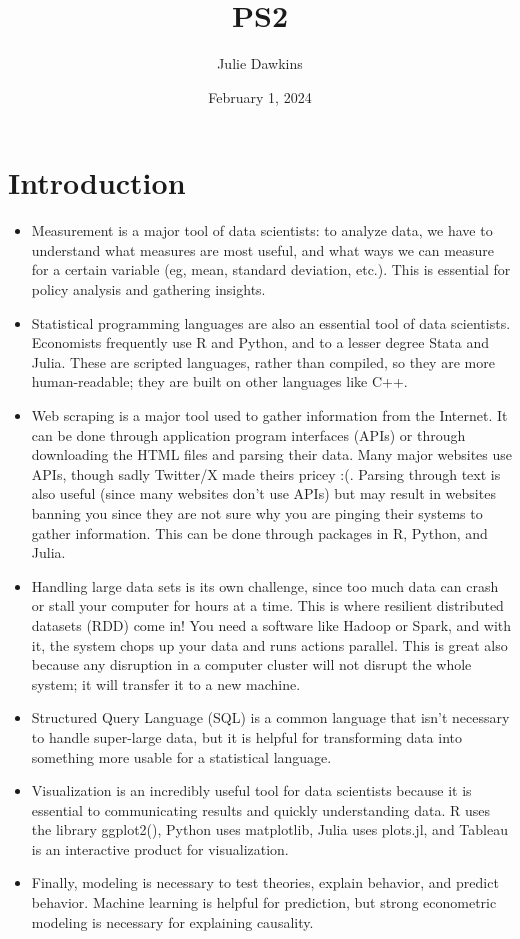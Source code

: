 \documentclass[12pt]{article}
\title{PS2}
\author{Julie Dawkins}
\date{February 1, 2024}
\begin{document}
\maketitle

\section*{Introduction}

\begin{itemize}
    \item Measurement is a major tool of data scientists: to analyze data, we have to understand what measures are most useful, and what ways we can measure for a certain variable (eg, mean, standard deviation, etc.). This is essential for policy analysis and gathering insights.
    \item Statistical programming languages are also an essential tool of data scientists. Economists frequently use R and Python, and to a lesser degree Stata and Julia. These are scripted languages, rather than compiled, so they are more human-readable; they are built on other languages like C++. 
    \item Web scraping is a major tool used to gather information from the Internet. It can be done through application program interfaces (APIs) or through downloading the HTML files and parsing their data. Many major websites use APIs, though sadly Twitter/X made theirs pricey :(. Parsing through text is also useful (since many websites don't use APIs) but may result in websites banning you since they are not sure why you are pinging their systems to gather information. This can be done through packages in R, Python, and Julia. 
    \item Handling large data sets is its own challenge, since too much data can crash or stall your computer for hours at a time. This is where resilient distributed datasets (RDD) come in! You need a software like Hadoop or Spark, and with it, the system chops up your data and runs actions parallel. This is great also because any disruption in a computer cluster will not disrupt the whole system; it will transfer it to a new machine. 
    \item Structured Query Language (SQL) is a common language that isn't necessary to handle super-large data, but it is helpful for transforming data into something more usable for a statistical language. 
    \item Visualization is an incredibly useful tool for data scientists because it is essential to communicating results and quickly understanding data. R uses the library ggplot2(), Python uses matplotlib, Julia uses plots.jl, and Tableau is an interactive product for visualization.  
    \item Finally, modeling is necessary to test theories, explain behavior, and predict behavior. Machine learning is helpful for prediction, but strong econometric modeling is necessary for explaining causality.
\end{itemize}
\end{document}
